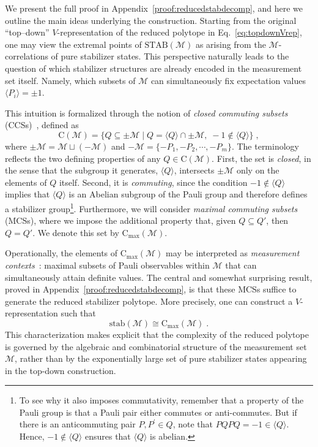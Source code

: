 \documentclass[10pt,aps,pra,twocolumn,floatfix,nofootinbib,superscriptaddress,longbibliography]{revtex4-2}
\newcommand{\1}{\mathbbm{1}}
\begin{document}
We present the full proof in Appendix~\ref{proof:reducedstabdecomp}, and here we outline the main ideas underlying the construction. Starting from the original ``top--down'' $V$-representation of the reduced polytope in Eq.~\eqref{eq:topdownVrep}, one may view the extremal points of $\mathrm{STAB}(\mathcal M)$ as arising from the $\mathcal M$-correlations of pure stabilizer states. This perspective naturally leads to the question of which stabilizer structures are already encoded in the measurement set itself. Namely, which subsets of $\mathcal M$ can simultaneously fix expectation values $\langle P_i \rangle=\pm1$.

This intuition is formalized through the notion of \emph{closed commuting subsets} (CCSs)~\cite{sun2025stabilizerground}, defined as
\begin{equation}
    \mathrm C(\mathcal M)
    =
    \{Q \subseteq \pm \mathcal M \;|\;
    Q = \langle Q\rangle \cap \pm \mathcal M,\;
    -1 \notin \langle Q\rangle\}\;,
    \label{CCS}
\end{equation}
where $\pm \mathcal M = \mathcal M \sqcup (-\mathcal M)$ and $-\mathcal M=\{-P_1,-P_2,\cdots,-P_m\}$. The terminology reflects the two defining properties of any $Q \in \mathrm C(\mathcal M)$. First, the set is \emph{closed}, in the sense that the subgroup it generates, $\langle Q\rangle$, intersects $\pm \mathcal M$ only on the elements of $Q$ itself. Second, it is \emph{commuting}, since the condition $-1 \notin \langle Q\rangle$ implies that $\langle Q\rangle$ is an Abelian subgroup of the Pauli group and therefore defines a stabilizer group\footnote{To see why it also imposes commutativity, remember that a property of the Pauli group is that a Pauli pair either commutes or anti-commutes. But if there is an anticommuting pair $P, P^\prime \in Q$, note that $PQPQ=-1 \in \langle Q\rangle$. Hence, $-1 \notin \langle Q\rangle$ ensures that $\langle Q \rangle$ is abelian.}. Furthermore, we will consider \textit{maximal commuting subsets} (MCSs), where we impose the additional property that, given $Q\subseteq Q'$, then $Q=Q'$. We denote this set by $\mathrm C_{\mathrm{max}}(\mathcal M)$.

Operationally, the elements of $\mathrm C_{\mathrm{max}}(\mathcal M)$ may be interpreted as \emph{measurement contexts}~\cite{amaral2018graph}: maximal subsets of Pauli observables within $\mathcal M$ that can simultaneously attain definite values. The central and somewhat surprising result, proved in Appendix~\ref{proof:reducedstabdecomp}, is that these MCSs suffice to generate the reduced stabilizer polytope. More precisely, one can construct a $V$-representation such that
\begin{equation}
   \mathrm{stab}(\mathcal M) \cong \mathrm C_{\mathrm{max}}(\mathcal M)\;.
\end{equation}
This characterization makes explicit that the complexity of the reduced polytope is governed by the algebraic and combinatorial structure of the measurement set $\mathcal M$, rather than by the exponentially large set of pure stabilizer states appearing in the top-down construction.
\end{document}
